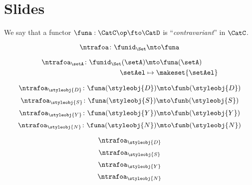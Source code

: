 
\section{Slides}

\begin{forslides}

    \begin{definition}
        \label{def:contravariant-functor}
        We say that a functor
        $
            \funa: \CatC \op \fto \CatD
        $
        is ``\emph{contravariant}'' in $\CatC$.
    \end{definition}

    \begin{equation}
        \label{eq:ex_nt_1}
        \ntrafoa \colon \funid_\Set \nto \funa
    \end{equation}

    \begin{equation}
        \label{eq:ex_nt_2}
        \begin{aligned}
            \ntrafoa_\setA \colon \funid_\Set(\setA) & \mto \funa(\setA) \\
            \setAel                                  & \mapsto \makeset{\setAel}
        \end{aligned}
    \end{equation}

    \begin{equation}
        \label{eq:eq_nt_3}
        \ntrafoa_{\styleobj{D}}\colon \funa(\styleobj{D}) \mto \funb(\styleobj{D})
    \end{equation}
    \begin{equation}
        \label{eq:eq_nt_4}
        \ntrafoa_{\styleobj{S}}\colon \funa(\styleobj{S}) \mto \funb(\styleobj{S})
    \end{equation}
    \begin{equation}
        \label{eq:eq_nt_5}
        \ntrafoa_{\styleobj{Y}}\colon \funa(\styleobj{Y}) \mto \funb(\styleobj{Y})
    \end{equation}
    \begin{equation}
        \label{eq:eq_nt_6}
        \ntrafoa_{\styleobj{N}}\colon \funa(\styleobj{N}) \mto \funb(\styleobj{N})
    \end{equation}

    \begin{equation}
        \label{eq:eq_nt_3a}
        \ntrafoa_{\styleobj{D}}
    \end{equation}
    \begin{equation}
        \label{eq:eq_nt_4a}
        \ntrafoa_{\styleobj{S}}
    \end{equation}
    \begin{equation}
        \label{eq:eq_nt_5a}
        \ntrafoa_{\styleobj{Y}}
    \end{equation}
    \begin{equation}
        \label{eq:eq_nt_6a}
        \ntrafoa_{\styleobj{N}}
    \end{equation}
\end{forslides}
